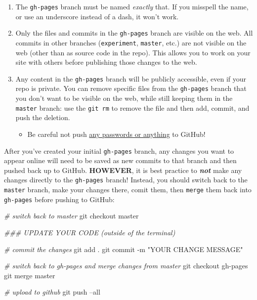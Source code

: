 \documentclass[]{book}
\newenvironment{Shaded}{\begin{snugshade}}{\end{snugshade}}
\newcommand{\StringTok}[1]{\textcolor[rgb]{0.31,0.60,0.02}{#1}}
\newcommand{\CommentTok}[1]{\textcolor[rgb]{0.56,0.35,0.01}{\textit{#1}}}
\newcommand{\FunctionTok}[1]{\textcolor[rgb]{0.00,0.00,0.00}{#1}}
\newcommand{\NormalTok}[1]{#1}
\providecommand{\tightlist}{%
  \setlength{\itemsep}{0pt}\setlength{\parskip}{0pt}}
\theoremstyle{definition}
\theoremstyle{definition}
\theoremstyle{remark}
\begin{document}
\begin{enumerate}
\def\labelenumi{\arabic{enumi}.}
\item
  The \texttt{gh-pages} branch must be named \emph{exactly} that. If you
  misspell the name, or use an underscore instead of a dash, it won't
  work.
\item
  Only the files and commits in the \texttt{gh-pages} branch are visible
  on the web. All commits in other branches (\texttt{experiment},
  \texttt{master}, etc.) are not visible on the web (other than as
  source code in the repo). This allows you to work on your site with
  others before publishing those changes to the web.
\item
  Any content in the \texttt{gh-pages} branch will be publicly
  accessible, even if your repo is private. You can remove specific
  files from the \texttt{gh-pages} branch that you don't want to be
  visible on the web, while still keeping them in the \texttt{master}
  branch: use the \texttt{git\ rm} to remove the file and then add,
  commit, and push the deletion.

  \begin{itemize}
  \tightlist
  \item
    Be careful not push
    \href{http://www.itnews.com.au/news/aws-urges-developers-to-scrub-github-of-secret-keys-375785}{any
    passwords or anything} to GitHub!
  \end{itemize}
\end{enumerate}

After you've created your initial \texttt{gh-pages} branch, any changes
you want to appear online will need to be saved as new commits to that
branch and then pushed back up to GitHub. \textbf{HOWEVER}, it is best
practice to \textbf{\emph{not}} make any changes directly to the
\texttt{gh-pages} branch! Instead, you should switch back to the
\texttt{master} branch, make your changes there, comit them, then
\texttt{merge} them back into \texttt{gh-pages} before pushing to
GitHub:

\begin{Shaded}
\begin{Highlighting}[]
\CommentTok{# switch back to master}
\FunctionTok{git}\NormalTok{ checkout master}

\CommentTok{### UPDATE YOUR CODE (outside of the terminal)}

\CommentTok{# commit the changes}
\FunctionTok{git}\NormalTok{ add .}
\FunctionTok{git}\NormalTok{ commit -m }\StringTok{"YOUR CHANGE MESSAGE"}

\CommentTok{# switch back to gh-pages and merge changes from master}
\FunctionTok{git}\NormalTok{ checkout gh-pages}
\FunctionTok{git}\NormalTok{ merge master}

\CommentTok{# upload to github}
\FunctionTok{git}\NormalTok{ push --all}
\end{Highlighting}
\end{Shaded}
\end{document}
